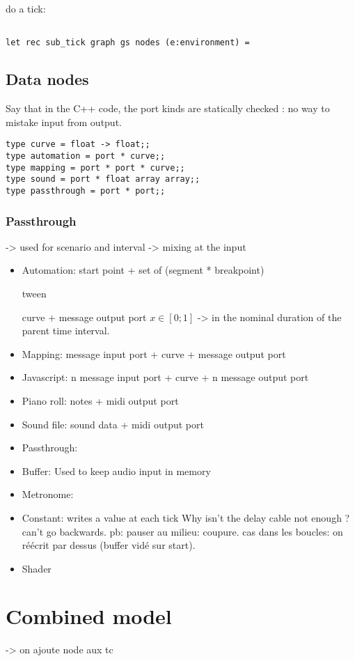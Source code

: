 \documentclass{article}
\begin{document}
do a tick: 

\begin{lstlisting}

let rec sub_tick graph gs nodes (e:environment) =
\end{lstlisting}


\subsection{Data nodes}
Say that in the C++ code, the port kinds are statically checked : no way to mistake input from output.
\begin{lstlisting}
type curve = float -> float;;
type automation = port * curve;;
type mapping = port * port * curve;;
type sound = port * float array array;;
type passthrough = port * port;;
\end{lstlisting}
\subsubsection{Passthrough}
-> used for scenario and interval
-> mixing at the input

\begin{itemize}
\item Automation: 
start point + set of (segment * breakpoint)

tween

curve + message output port
$x\in[0;1]$ -> in the nominal duration of the parent time interval.

\item Mapping: message input port + curve + message output port
\item Javascript:  n message input port + curve + n message output port
\item Piano roll:  notes + midi output port
\item Sound file: sound data + midi output port
\item Passthrough:
\item Buffer: Used to keep audio input in memory
\item Metronome: 
\item Constant: writes a value at each tick
Why isn't the delay cable not enough ? can't go backwards. 
pb: pauser au milieu: coupure. cas dans les boucles: on réécrit par dessus (buffer vidé sur start).
\item Shader
\end{itemize}


\section{Combined model}
-> on ajoute node aux tc
\end{document}
